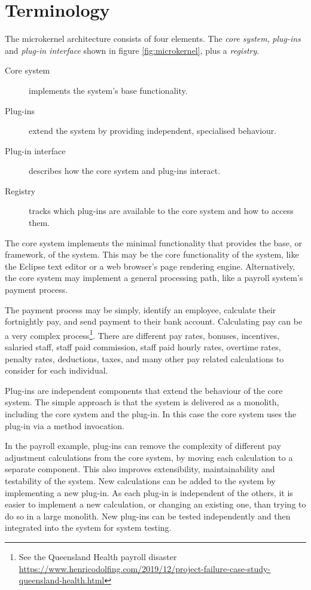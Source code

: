 \section{Terminology}

The microkernel architecture consists of four elements.
The \emph{core system}, \emph{plug-ins} and \emph{plug-in interface} shown in figure \ref{fig:microkernel}, plus a \emph{registry}.

\begin{description}
    \item[Core system] implements the system's base functionality.
    \item[Plug-ins] extend the system by providing independent, specialised behaviour.
    \item[Plug-in interface] describes how the core system and plug-ins interact.
    \item[Registry] tracks which plug-ins are available to the core system and how to access them.
\end{description}

The core system implements the minimal functionality that provides the base, or framework, of the system.
This may be the core functionality of the system, like the Eclipse text editor or a web browser's page rendering engine.
Alternatively, the core system may implement a general processing path, like a payroll system's payment process.

The payment process may be simply, identify an employee, calculate their fortnightly pay, and send payment to their bank account.
Calculating pay can be a very complex process\footnote{See the Queensland Health payroll disaster
\url{https://www.henricodolfing.com/2019/12/project-failure-case-study-queensland-health.html}}.
There are different pay rates, bonuses, incentives, salaried staff, staff paid commission, staff paid hourly rates,
overtime rates, penalty rates, deductions, taxes, and many other pay related calculations to consider for each individual.

Plug-ins are independent components that extend the behaviour of the core system.
The simple approach is that the system is delivered as a monolith, including the core system and the plug-in.
In this case the core system uses the plug-in via a method invocation.

In the payroll example, plug-ins can remove the complexity of different pay adjustment calculations from the core system, by moving each calculation to a separate component.
This also improves extensibility, maintainability and testability of the system.
New calculations can be added to the system by implementing a new plug-in.
As each plug-in is independent of the others, it is easier to implement a new calculation, or changing an existing one, than trying to do so in a large monolith.
New plug-ins can be tested independently and then integrated into the system for system testing.

